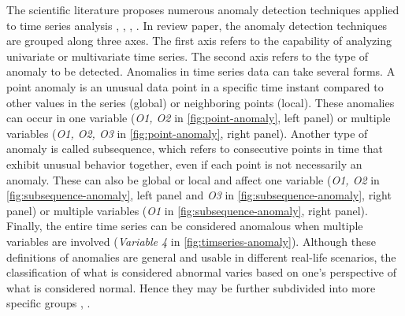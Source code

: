 The scientific literature proposes numerous anomaly detection techniques applied to time series analysis \cite{chandola_2019}, \cite{blazquez2020review}, \cite{choi2021deep}, \cite{Garg_2021}. In \cite{blazquez2020review} review paper, the anomaly detection techniques are grouped along three axes. The first axis refers to the capability of analyzing univariate or multivariate time series. The second axis refers to the type of anomaly to be detected. Anomalies in time series data can take several forms. A point anomaly is an unusual data point in a specific time instant compared to other values in the series (global) or neighboring points (local). These anomalies can occur in one variable (\textit{O1, O2} in \autoref{fig:point-anomaly}, left panel) or multiple variables (\textit{O1, O2, O3} in \autoref{fig:point-anomaly}, right panel). Another type of anomaly is called subsequence, which refers to consecutive points in time that exhibit unusual behavior together, even if each point is not necessarily an anomaly. These can also be global or local and affect one variable (\textit{O1, O2} in \autoref{fig:subsequence-anomaly}, left panel and \textit{O3} in \autoref{fig:subsequence-anomaly}, right panel) or multiple variables (\textit{O1} in \autoref{fig:subsequence-anomaly}, right panel). Finally, the entire time series can be considered anomalous when multiple variables are involved (\textit{Variable 4} in \autoref{fig:timseries-anomaly}). Although these definitions of anomalies are general and usable in different real-life scenarios, the classification of what is considered abnormal varies based on one's perspective of what is considered normal. Hence they may be further subdivided into more specific groups \cite{choi2021deep}, \cite{Tang_2018}. 

